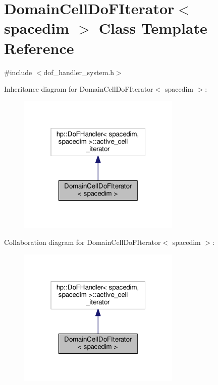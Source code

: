 \hypertarget{class_domain_cell_do_f_iterator}{}\section{Domain\+Cell\+Do\+F\+Iterator$<$ spacedim $>$ Class Template Reference}
\label{class_domain_cell_do_f_iterator}


{\ttfamily \#include $<$dof\+\_\+handler\+\_\+system.\+h$>$}



Inheritance diagram for Domain\+Cell\+Do\+F\+Iterator$<$ spacedim $>$\+:\nopagebreak
\begin{figure}[H]
\begin{center}
\leavevmode
\includegraphics[width=220pt]{class_domain_cell_do_f_iterator__inherit__graph}
\end{center}
\end{figure}


Collaboration diagram for Domain\+Cell\+Do\+F\+Iterator$<$ spacedim $>$\+:\nopagebreak
\begin{figure}[H]
\begin{center}
\leavevmode
\includegraphics[width=220pt]{class_domain_cell_do_f_iterator__coll__graph}
\end{center}
\end{figure}
